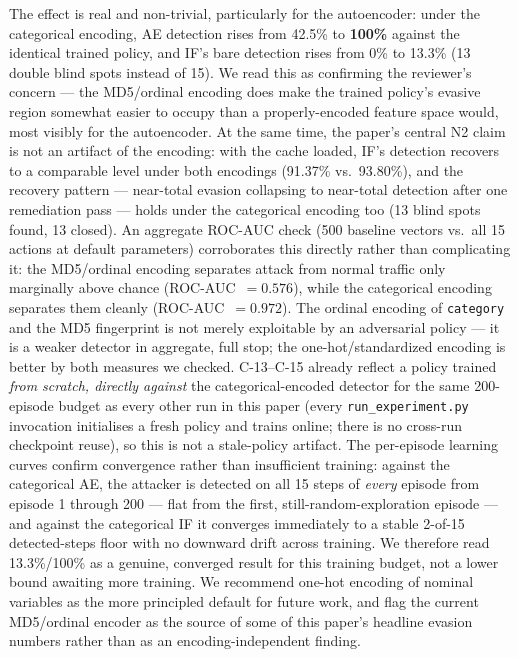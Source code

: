\documentclass[sigconf]{acmart}
\begin{document}
The effect is real and non-trivial, particularly for the autoencoder:
under the categorical encoding, AE detection rises from 42.5\% to
\textbf{100\%} against the identical trained policy, and IF's bare
detection rises from 0\% to 13.3\% (13 double blind spots instead of
15). We read this as confirming the reviewer's concern --- the
MD5/ordinal encoding does make the trained policy's evasive region
somewhat easier to occupy than a properly-encoded feature space would,
most visibly for the autoencoder. At the same time, the paper's central
N2 claim is not an artifact of the encoding: with the cache loaded,
IF's detection recovers to a comparable level under both encodings
(91.37\% vs.\ 93.80\%), and the recovery pattern --- near-total
evasion collapsing to near-total detection after one remediation pass
--- holds under the categorical encoding too (13 blind spots found, 13
closed). An aggregate ROC-AUC check (500 baseline vectors vs.\ all 15
actions at default parameters) corroborates this directly rather than
complicating it: the MD5/ordinal encoding separates attack from normal
traffic only marginally above chance (ROC-AUC~$= 0.576$), while the
categorical encoding separates them cleanly (ROC-AUC~$= 0.972$). The
ordinal encoding of \texttt{category} and the MD5 fingerprint is not
merely exploitable by an adversarial policy --- it is a weaker detector
in aggregate, full stop; the one-hot/standardized encoding is better
by both measures we checked. C-13--C-15 already reflect a policy
trained \emph{from scratch, directly against} the categorical-encoded
detector for the same 200-episode budget as every other run in this
paper (every \texttt{run\_experiment.py} invocation initialises a fresh
policy and trains online; there is no cross-run checkpoint reuse), so
this is not a stale-policy artifact. The per-episode learning curves
confirm convergence rather than insufficient training: against the
categorical AE, the attacker is detected on all 15 steps of \emph{every}
episode from episode 1 through 200 --- flat from the first,
still-random-exploration episode --- and against the categorical IF it
converges immediately to a stable 2-of-15 detected-steps floor with no
downward drift across training. We therefore read 13.3\%/100\% as a
genuine, converged result for this training budget, not a lower bound
awaiting more training. We recommend one-hot encoding of nominal
variables as the more principled default for future work, and flag the
current MD5/ordinal encoder as the source of some of this paper's
headline evasion numbers rather than as an encoding-independent
finding.
\end{document}

